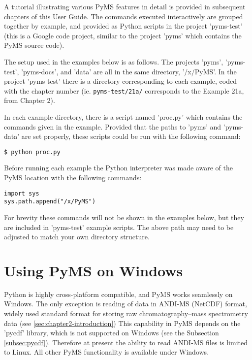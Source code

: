 A tutorial illustrating various PyMS features in detail is provided
in subsequent chapters of this User Guide. The commands executed
interactively are grouped together by example, and provided as
Python scripts in the project 'pyms-test' (this is a Google code
project, similar to the project 'pyms' which contains the PyMS
source code).

The setup used in the examples below is as follows. The projects 'pyms',
'pyms-test', 'pyms-docs', and 'data' are all in the same directory,
'/x/PyMS'. In the project 'pyms-test' there is a directory corresponding
to each example, coded with the chapter number (ie. {\tt pyms-test/21a/}
corresponds to the Example 21a, from Chapter 2).

In each example directory, there is a script named 'proc.py' which
contains the commands given in the example.  Provided that the paths
to 'pyms' and 'pyms-data' are set properly, these scripts could be
run with the following command:

\begin{verbatim}
$ python proc.py
\end{verbatim}

Before running each example the Python interpreter was made aware of
the PyMS location with the following commands:

\begin{verbatim}
import sys
sys.path.append("/x/PyMS")
\end{verbatim}

For brevity these commands will not be shown in the examples below,
but they are included in 'pyms-test' example scripts.  The above
path may need to be adjusted to match your own directory structure.

\section{\label{sec:pyms-windows}Using PyMS on Windows}

Python is highly cross-platform compatible, and PyMS works seamlessly
on Windows. The only exception is reading of data in ANDI-MS (NetCDF)
format, widely used standard format for storing raw
chromatography--mass spectrometry data (see \ref{sec:chapter2-introduction})
This capability in PyMS depends on the 'pycdf' library, which is not
supported on Windows (see the Subsection \ref{subsec:pycdf}). Therefore
at present the ability to read ANDI-MS files is limited to Linux. All
other PyMS functionality is available under Windows.

